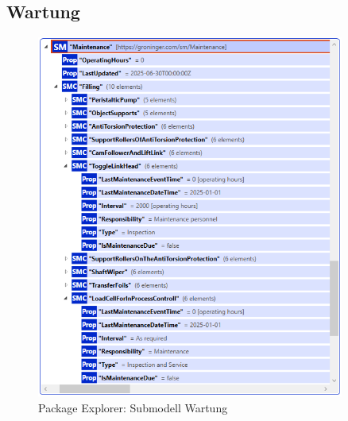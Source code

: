 \subsection{Wartung}
\begin{figure}[H]
    \centering
    \includegraphics[width=0.9\textwidth]{Bilder/ErgebnissePackageExplorer/Wartung.PNG}
    \caption{Package Explorer: Submodell Wartung}
\end{figure}

